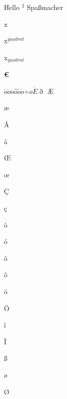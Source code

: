 \documentclass{book}
\begin{document}
Hello $^2$ Spa\ss macher

x

x$^{quadrat}$

x$_{quadrat}$

\textbf{\euro }

$
\acute{o} 
\grave{o}
\ddot{o}
\hat{o}
\tilde{o} 
\dot{o}
\circ{o} 
\grave{E}
\eth
$
\AE

\ae

\AA

\aa 

\OE

\oe

\c C

\c c

\`o

\'o

\~o

\^o

\"o

\"O

\"i 

\"I

\ss

\o

\O
\end{document}
